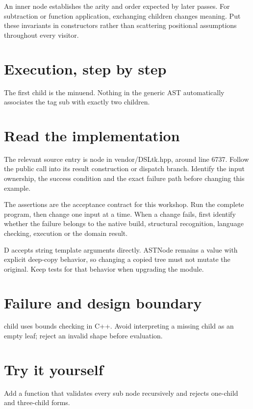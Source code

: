\clearpage
{}
An inner node establishes the arity and order expected by later passes. For subtraction or function application, exchanging children changes meaning. Put these invariants in constructors rather than scattering positional assumptions throughout every visitor.


\section*{Execution, step by step}
The first child is the minuend. Nothing in the generic AST automatically associates the tag sub with exactly two children.

\section*{Read the implementation}
The relevant source entry is node in vendor/DSLtk.hpp, around line 6737. Follow the public call into its result construction or dispatch branch. Identify the input ownership, the success condition and the exact failure path before changing this example.

The assertions are the acceptance contract for this workshop. Run the complete program, then change one input at a time. When a change fails, first identify whether the failure belongs to the native build, structural recognition, language checking, execution or the domain result.

\clearpage
{}
D accepts string template arguments directly. ASTNode remains a value with explicit deep-copy behavior, so changing a copied tree must not mutate the original. Keep tests for that behavior when upgrading the module.


\section*{Failure and design boundary}
child uses bounds checking in C++. Avoid interpreting a missing child as an empty leaf; reject an invalid shape before evaluation.

\section*{Try it yourself}
Add a function that validates every sub node recursively and rejects one-child and three-child forms.

